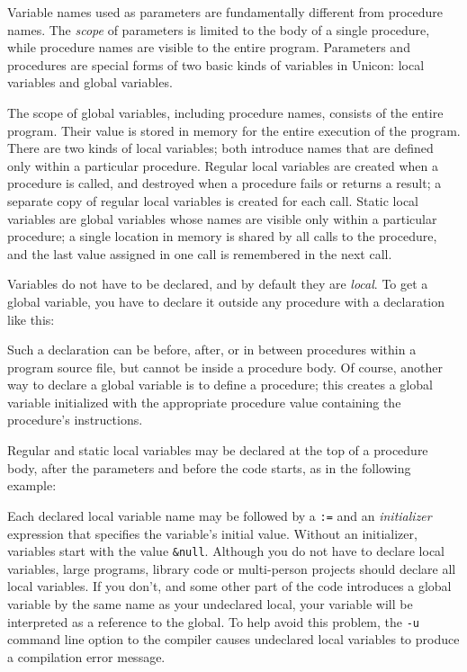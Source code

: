 Variable names used as parameters are fundamentally different
from procedure names. The \textit{scope} of parameters is limited
to the body of a single procedure, while procedure names are visible to the
entire program.  Parameters and procedures are special forms of two basic kinds
of variables in Unicon: local variables and global variables.

The scope of global variables, including
procedure names, consists of the entire program. Their value is stored
in memory for the entire execution of the program. There are two kinds
of local variables; both introduce names that
are defined only within a particular procedure. Regular local
variables are created when a procedure is called, and destroyed when a
procedure fails or returns a result; a separate copy of regular local
variables is created for each call. Static
local variables are global variables whose names are visible only
within a particular procedure; a single location in memory is shared
by all calls to the procedure, and the last value assigned in one call
is remembered in the next call.

Variables do not have to be declared, and by default they are \textit{local}.
To get a global variable, you have to declare it outside any procedure with a
declaration like this:


Such a declaration can be before, after, or in between procedures within
a program source file, but cannot be inside a procedure body. Of
course, another way to declare a global variable is to define a
procedure; this creates a global variable initialized with the
appropriate procedure value containing the procedure's
instructions.

Regular and static local variables may be declared at the top of a
procedure body, after the parameters and before the code starts, as in
the following example:


Each declared local variable name may be followed by a \texttt{:=} and
an \textit{initializer} expression that specifies the
variable's initial value. Without an initializer,
variables start with the value \texttt{\&null}. Although
you do not have to declare local variables, large programs,
library code or multi-person projects should declare
all local variables. If you don't, and some other part
of the code introduces a global variable by the same name as your
undeclared local, your variable will be interpreted as a
reference to the global. To help avoid this
problem, the \texttt{{}-u} command line option to the
compiler causes undeclared
local variables to produce a compilation error message.

